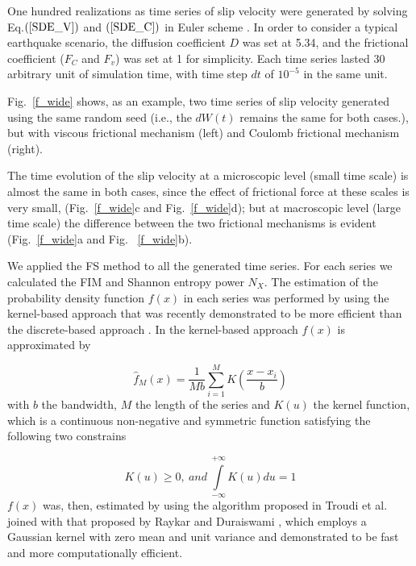 \documentclass[%
 aip,
rsi,%
 amsmath,amssymb,
 reprint,%
]{revtex4-1}
\begin{document}
One hundred realizations as time series of slip velocity were generated by solving Eq.$(\ref{SDE_V})$ and $(\ref{SDE_C})$ in Euler scheme \cite{cyganowski_elementary_2001}. In order to consider a typical earthquake scenario, the diffusion coefficient $D$ was set at 5.34, and the frictional coefficient ($F_C$ and $F_v$) was set at 1 for simplicity\cite{wu_stochastic_2018}. Each time series lasted 30 arbitrary unit of simulation time, with time step $dt$ of $10^{-5}$ in the same unit.

Fig.~\ref{f_wide} shows, as an example, two time series of slip velocity generated using the same random seed (i.e., the $dW(t)$ remains the same for both cases.), but with viscous frictional mechanism (left) and Coulomb frictional mechanism (right).

The time evolution of the slip velocity at a microscopic level (small time scale) is almost the same in both cases, since the effect of frictional force at these scales is very small, (Fig.~\ref{f_wide}c and Fig.~\ref{f_wide}d); but at macroscopic level (large time scale) the difference between the two frictional mechanisms is evident (Fig.~\ref{f_wide}a and Fig. ~\ref{f_wide}b).

We applied the FS method to all the generated time series. For each series we calculated the FIM and Shannon entropy power $N_X$. The estimation of the probability density function $f(x)$ in each series was performed by using the kernel-based approach \cite{devroye_course_1987,janicki_simulation_1994} that was recently demonstrated \cite{telesca_performance_2017} to be more efficient than the discrete-based approach \cite{chelani_irregularity_2014,fath_regime_2003}. In the kernel-based approach $f(x)$ is approximated by

\begin{equation}
    \hat{f}_M(x)=\frac{1}{Mb}\sum_{i=1}^{M}K(\frac{x-x_i}{b}) \label{fM}
\end{equation}
with $b$ the bandwidth, $M$ the length of the series and $K(u)$ the kernel function, which is a continuous non-negative and symmetric function satisfying the following two constrains

\begin{equation}
    K(u)\geq 0,\ and\ \int\limits_{-\infty}^{+\infty}K(u)du=1
\end{equation}
$f(x)$ was, then, estimated by using the algorithm proposed in  Troudi et al.\cite{troudi_analytical_2008} joined with that proposed by Raykar and Duraiswami \cite{raykar_fast_2006}, which employs a Gaussian kernel with zero mean and unit variance and demonstrated to be fast and more computationally efficient.
\end{document}

